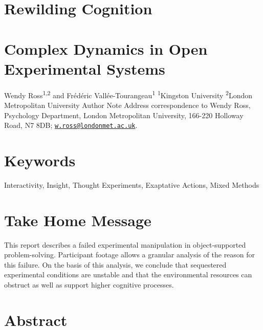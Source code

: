 
\section{Rewilding Cognition}


\section{Complex Dynamics in Open Experimental Systems}

Wendy Ross\textsuperscript{1,2} and Frédéric Vallée-Tourangeau\textsuperscript{1} 
\textsuperscript{1}Kingston University \textsuperscript{2}London Metropolitan University Author Note Address correspondence to Wendy Ross, Psychology Department, London Metropolitan University, 166-220 Holloway Road, N7 8DB; \href{mailto:w.ross@londonmet.ac.uk}{\nolinkurl{w.ross@londonmet.ac.uk}}.


\section{Keywords }

Interactivity, Insight, Thought Experiments, Exaptative Actions, Mixed Methods 
\section{Take Home Message }

This report describes a failed experimental manipulation in object-supported problem-solving. Participant footage allows a granular analysis of the reason for this failure. On the basis of this analysis, we conclude that sequestered experimental conditions are unstable and that the environmental resources can obstruct as well as support higher cognitive processes.


\section{Abstract}

